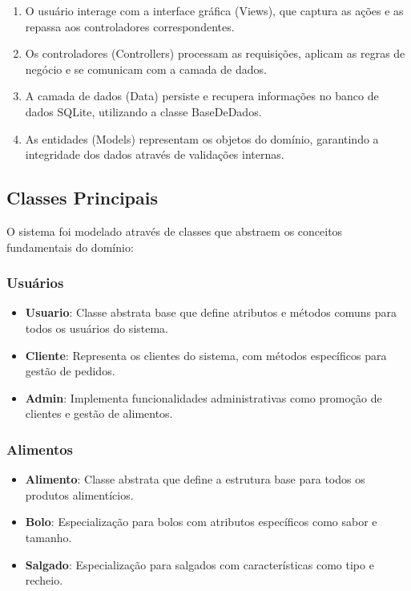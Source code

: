 \documentclass[conference]{IEEEtran}
\begin{document}
\begin{enumerate}
    \item O usuário interage com a interface gráfica (Views), que captura as ações e as repassa aos controladores correspondentes.
    
    \item Os controladores (Controllers) processam as requisições, aplicam as regras de negócio e se comunicam com a camada de dados.
    
    \item A camada de dados (Data) persiste e recupera informações no banco de dados SQLite, utilizando a classe BaseDeDados.
    
    \item As entidades (Models) representam os objetos do domínio, garantindo a integridade dos dados através de validações internas.
\end{enumerate}

\subsection{Classes Principais}
O sistema foi modelado através de classes que abstraem os conceitos fundamentais do domínio:

\subsubsection{Usuários}
\begin{itemize}
    \item \textbf{Usuario}: Classe abstrata base que define atributos e métodos comuns para todos os usuários do sistema.
    \item \textbf{Cliente}: Representa os clientes do sistema, com métodos específicos para gestão de pedidos.
    \item \textbf{Admin}: Implementa funcionalidades administrativas como promoção de clientes e gestão de alimentos.
\end{itemize}

\subsubsection{Alimentos}
\begin{itemize}
    \item \textbf{Alimento}: Classe abstrata que define a estrutura base para todos os produtos alimentícios.
    \item \textbf{Bolo}: Especialização para bolos com atributos específicos como sabor e tamanho.
    \item \textbf{Salgado}: Especialização para salgados com características como tipo e recheio.
\end{itemize}
\end{document}

